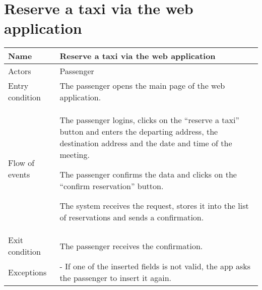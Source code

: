 \section{Reserve a taxi via the web application}
\begin{center}
\begin{longtable}{|l| p{9cm}|}
\hline
Name &
Reserve a taxi via the web application \\
\hline
Actors &
Passenger \\
\hline
Entry condition & 
The passenger opens the main page of the web application. \\
\hline
Flow of events & 
The passenger logins, clicks on the ``reserve a taxi'' button and enters the departing address, the destination address and the date and time of the meeting.

The passenger confirms the data and clicks on the ``confirm reservation'' button.

The system receives the request, stores it into the list of reservations and sends a confirmation. \\
\hline
Exit condition &
The passenger receives the confirmation. \\
\hline
Exceptions &
- If one of the inserted fields is not valid, the app asks the passenger to insert it again. \\
\hline
\end{longtable}
\end{center}


